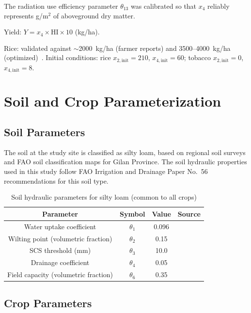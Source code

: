 The radiation use efficiency parameter $\theta_{13}$ was calibrated so that $x_4$ reliably represents g/m$^2$ of aboveground dry matter. 

Yield: $Y = x_4 \times \text{HI} \times 10$ (kg/ha). 


Rice: validated against $\sim$2000~kg/ha (farmer reports) and 3500--4000~kg/ha (optimized)~\cite{jalali2021}. Initial conditions: rice $x_{2,\text{init}} = 210$, $x_{4,\text{init}} = 60$; tobacco $x_{2,\text{init}} = 0$, $x_{4,\text{init}} = 8$.

\section{Soil and Crop Parameterization}
\label{sec:soil_crop_params}

\subsection{Soil Parameters}
\label{soil_param}
The soil at the study site is classified as silty loam, based on regional soil surveys and FAO soil classification maps for Gilan Province. The soil hydraulic properties used in this study follow FAO Irrigation and Drainage Paper No.~56 recommendations for this soil type. 

\begin{table}[htbp]
\centering
\caption{Soil hydraulic parameters for silty loam (common to all crops)}
\label{tab:soil}
\begin{tabular}{cccc}
\toprule
\textbf{Parameter} & \textbf{Symbol} & \textbf{Value} & \textbf{Source}\\
\midrule
Water uptake coefficient & $\theta_1$ & 0.096 & \cite{Lopezjimenez2024} \\
Wilting point (volumetric fraction) & $\theta_2$ & 0.15 & \cite{allen1998} \\
SCS threshold (mm) & $\theta_3$ & 10.0 & \cite{Lopezjimenez2024} \\
Drainage coefficient & $\theta_4$ & 0.05 & \cite{Lopezjimenez2024} \\
Field capacity (volumetric fraction) & $\theta_6$ & 0.35 & \cite{allen1998} \\
\bottomrule
\end{tabular}
\end{table}

\subsection{Crop Parameters}
\label{crop_param}

